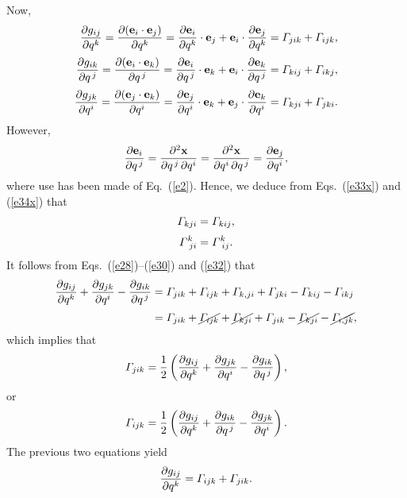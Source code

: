 \documentclass[12pt,prb,aps,notitlepage]{revtex4-1}
\begin{document}
Now, 
\begin{align}\label{e28}
\frac{\partial g_{ij}}{\partial q^k} = \frac{\partial ({\bf e}_i\cdot{\bf e}_j)}{\partial q^k}= \frac{\partial {\bf e}_i}{\partial q^k}\cdot{\bf e}_j + {\bf e}_i\cdot\frac{\partial {\bf e}_j}{\partial q^k}= {\mit\Gamma}_{jik} + {\mit\Gamma}_{ijk},\\[0.5ex]
\frac{\partial g_{ik}}{\partial q^{\,j}} = \frac{\partial ({\bf e}_i\cdot{\bf e}_k)}{\partial q^{\,j}}= \frac{\partial {\bf e}_i}{\partial q^{\,j}}\cdot{\bf e}_k+ {\bf e}_i\cdot\frac{\partial {\bf e}_k}{\partial q^{\,j}}= {\mit\Gamma}_{kij} + {\mit\Gamma}_{ikj},\\[0.5ex]
\frac{\partial g_{jk}}{\partial q^i} = \frac{\partial ({\bf e}_j\cdot{\bf e}_k)}{\partial q^i}= \frac{\partial {\bf e}_j}{\partial q^i}\cdot{\bf e}_k+ {\bf e}_j\cdot\frac{\partial {\bf e}_k}{\partial q^i}= {\mit\Gamma}_{kji} + {\mit\Gamma}_{jki}.\label{e30}
\end{align}
However,
\begin{equation}
\frac{\partial{\bf e}_i}{\partial q^{\,j}} = \frac{\partial^2{\bf x}}{\partial q^{\,j}\,\partial q^{i}}= \frac{\partial^2{\bf x}}{\partial q^{i}\,\partial q^{\,j}}
= \frac{\partial{\bf e}_j}{\partial q^i},
\end{equation}
where use has been made of Eq.~(\ref{e2}). Hence, we deduce  from Eqs.~(\ref{e33x}) and (\ref{e34x}) that
\begin{align}\label{e32}
{\mit\Gamma}_{kji}&= {\mit\Gamma}_{kij},\\[0.5ex]
{\mit\Gamma}^k_{\,\,ji}&= {\mit\Gamma}^k_{\,\,ij}.\label{e32a}
\end{align}
It follows  from Eqs.~(\ref{e28})--(\ref{e30}) and (\ref{e32}) that
\begin{align}
\frac{\partial g_{ij}}{\partial q^k} + \frac{\partial g_{jk}}{\partial q^i} -\frac{\partial g_{ik}}{\partial q^{\,j}}& = {\mit\Gamma}_{jik} + {\mit\Gamma}_{ijk}+ {\mit\Gamma}_{k,ji} + {\mit\Gamma}_{jki}-{\mit\Gamma}_{kij} - {\mit\Gamma}_{ikj}\nonumber\\[0.5ex]
&= {\mit\Gamma}_{jik} + \cancel{{\mit\Gamma}_{ijk}}+ \cancel{{\mit\Gamma}_{kji}} + {\mit\Gamma}_{jik}-\cancel{{\mit\Gamma}_{kji}} - \cancel{{\mit\Gamma}_{i,jk}},
\end{align}
which implies that
\begin{equation}
 {\mit\Gamma}_{jik}=\frac{1}{2}\left(\frac{\partial g_{ij}}{\partial q^k} + \frac{\partial g_{jk}}{\partial q^i} -\frac{\partial g_{ik}}{\partial q^{\,j}}\right),
 \end{equation}
 or 
 \begin{equation}\label{e34}
 {\mit\Gamma}_{ijk}=\frac{1}{2}\left(\frac{\partial g_{ij}}{\partial q^k} + \frac{\partial g_{ik}}{\partial q^{\,j}} -\frac{\partial g_{jk}}{\partial q^{i}}\right).
 \end{equation}
 The previous two equations yield
 \begin{equation}\label{e35}
 \frac{\partial g_{ij}}{\partial q^k} = {\mit\Gamma}_{ijk} + {\mit\Gamma}_{jik}.
 \end{equation}
 
\end{document}
